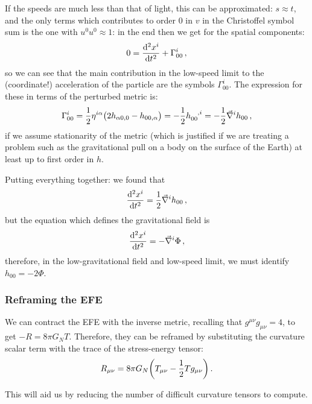 \documentclass[main.tex]{subfiles}
\begin{document}
If the speeds are much less than that of light, this can be approximated: \(s \approx t\), and the only terms which contributes to order 0 in \(v\) in the Christoffel symbol sum is the one with \(u^{0} u^{0}\approx 1\): in the end then we get for the spatial components: 
%
\begin{equation}
  0 = \dv[2]{x^{i}}{t} + \Gamma^{i}_{00}
\,,
\end{equation}
%
so we can see that the main contribution in the low-speed limit to the (coordinate!) acceleration of the particle are the symbols \(\Gamma^{i}_{00}\).
The expression for these in terms of the perturbed metric is: 
%
\begin{equation} \label{eq:weak-field-Christoffel}
  \Gamma^{i}_{00} 
  = \frac{1}{2} \eta^{i \alpha } \qty(2 h_{\alpha 0, 0} - h_{00, \alpha }) 
  = -\frac{1}{2} \tensor{h}{_{00}^{,i}}= -\frac{1}{2} \vec{\nabla}^{i} h_{00}
\,,
\end{equation}
%
if we assume stationarity of the metric (which is justified if we are treating a problem such as the gravitational pull on a body on the surface of the Earth) at least up to first order in \(h\).

Putting everything together: we found that 
%
\begin{equation}
  \dv[2]{x^{i}}{t} = \frac{1}{2}\vec{\nabla}^{i}h_{00}
\,,
\end{equation}
%
but the equation which defines the gravitational field is 
%
\begin{equation}
  \dv[2]{x^{i}}{t} = - \vec{\nabla}^{i} \Phi 
\,,
\end{equation}
%
therefore, in the low-gravitational field and low-speed limit, we must identify \(h_{00} = -2 \Phi \).

\subsubsection{Reframing the EFE}

We can contract the EFE with the inverse metric, recalling that \(g^{\mu \nu }g_{\mu \nu }= 4\), to get \(-R = 8 \pi G_N T\). Therefore, they can be reframed by substituting the curvature scalar term with the trace of the stress-energy tensor: 
%
\begin{equation}
  R_{\mu \nu } = 8 \pi G_N \qty(T_{ \mu \nu }- \frac{1}{2} T g_{\mu \nu }) 
\,.
\end{equation}

This will aid us by reducing the number of difficult curvature tensors to compute.
\end{document}
